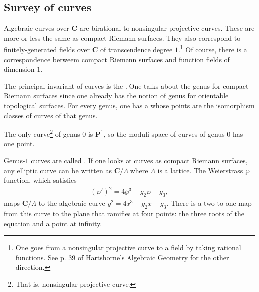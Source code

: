 \documentclass[11pt, oneside,margin=1in]{article}
\begin{document}
\subsection{Survey of curves}
Algebraic curves over $\mathbf{C}$ are birational to nonsingular projective curves. These are more or less the same as compact Riemann surfaces. They also correspond to finitely-generated fields over $\mathbf{C}$ of transcendence degree $1$.\footnote{One goes from a nonsingular projective curve to a field by taking rational functions. See p. 39 of Hartshorne's \underline{Algebraic Geometry} for the other direction.} Of course, there is a correspondence betweem compact Riemann surfaces and function fields of dimension $1$.

The principal invariant of curves is the . One talks about the genus for compact Riemann surfaces since one already has the notion of genus for orientable topological surfaces. For every genus, one has a  whose points are the isomorphism classes of curves of that genus.

The only curve\footnote{That is, nonsingular projective curve.} of genus $0$ is $\mathbf{P}^1$, so the moduli space of curves of genus $0$ has one point.

Genus-$1$ curves are called . If one looks at curves as compact Riemann surfaces, any elliptic curve can be written as $\mathbf{C}/\Lambda$ where $\Lambda$ is a lattice. The Weierstrass $\wp$ function, which satisfies
\begin{align*}
	(\wp') ^2 = 4\wp^3 -g_2\wp-g_3,
\end{align*}
maps $\mathbf{C}/\Lambda$ to the algebraic curve $y^2=4x^3-g_2x-g_3$. There is a two-to-one map from this curve to the plane that ramifies at four points: the three roots of the equation and a point at infinity.
\end{document}
